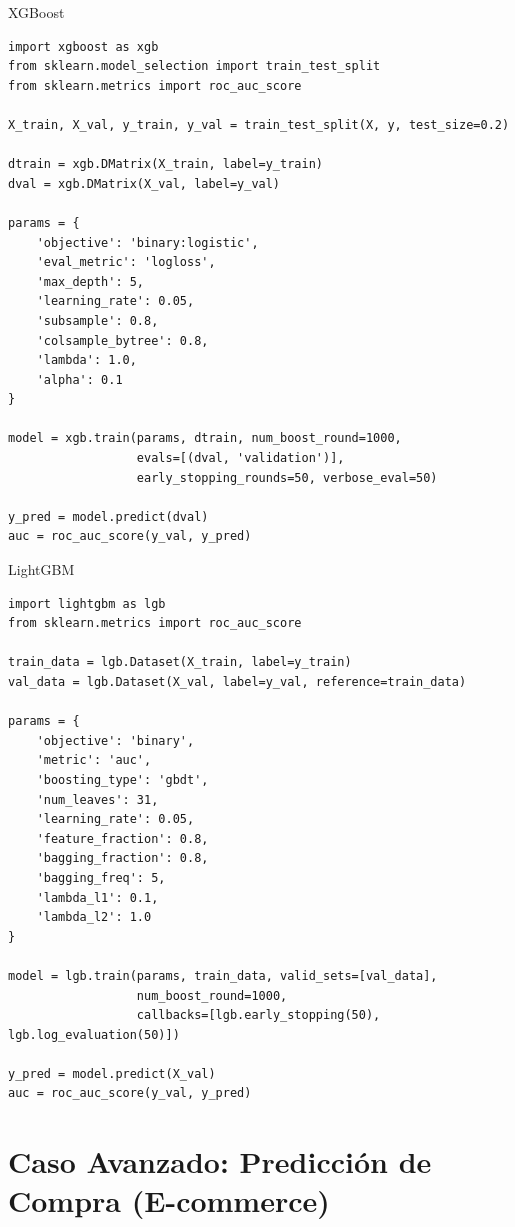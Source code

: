 \documentclass[aspectratio=169, 10pt, xcolor=table]{beamer}
\begin{document}
\begin{frame}[fragile]{XGBoost}
    \begin{lstlisting}
import xgboost as xgb
from sklearn.model_selection import train_test_split
from sklearn.metrics import roc_auc_score

X_train, X_val, y_train, y_val = train_test_split(X, y, test_size=0.2)

dtrain = xgb.DMatrix(X_train, label=y_train)
dval = xgb.DMatrix(X_val, label=y_val)

params = {
    'objective': 'binary:logistic',
    'eval_metric': 'logloss',
    'max_depth': 5,
    'learning_rate': 0.05,
    'subsample': 0.8,
    'colsample_bytree': 0.8,
    'lambda': 1.0,
    'alpha': 0.1
}

model = xgb.train(params, dtrain, num_boost_round=1000,
                  evals=[(dval, 'validation')],
                  early_stopping_rounds=50, verbose_eval=50)

y_pred = model.predict(dval)
auc = roc_auc_score(y_val, y_pred)
    \end{lstlisting}
\end{frame}

\begin{frame}[fragile]{LightGBM}
    \begin{lstlisting}
import lightgbm as lgb
from sklearn.metrics import roc_auc_score

train_data = lgb.Dataset(X_train, label=y_train)
val_data = lgb.Dataset(X_val, label=y_val, reference=train_data)

params = {
    'objective': 'binary',
    'metric': 'auc',
    'boosting_type': 'gbdt',
    'num_leaves': 31,
    'learning_rate': 0.05,
    'feature_fraction': 0.8,
    'bagging_fraction': 0.8,
    'bagging_freq': 5,
    'lambda_l1': 0.1,
    'lambda_l2': 1.0
}

model = lgb.train(params, train_data, valid_sets=[val_data],
                  num_boost_round=1000,
                  callbacks=[lgb.early_stopping(50), lgb.log_evaluation(50)])

y_pred = model.predict(X_val)
auc = roc_auc_score(y_val, y_pred)
    \end{lstlisting}
\end{frame}

\section{Caso Avanzado: Predicción de Compra (E-commerce)}
\end{document}
